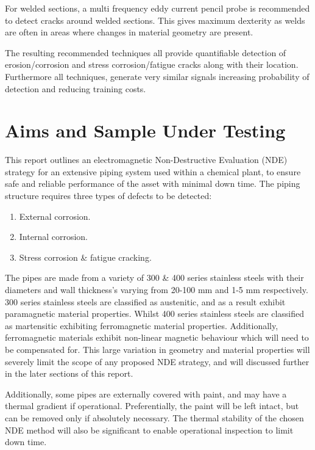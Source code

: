 \documentclass[a4paper,twoside,11pt]{article}
\begin{document}
For welded sections, a multi frequency eddy current pencil probe is recommended to detect cracks around welded sections. 
This gives maximum dexterity as welds are often in areas where changes in material geometry are present.

The resulting recommended techniques all provide quantifiable detection of erosion/corrosion and stress corrosion/fatigue cracks along with their location. Furthermore all techniques, generate very similar signals increasing probability of detection and reducing training costs.

\newpage


\section{Aims and Sample Under Testing}

This report outlines an electromagnetic Non-Destructive Evaluation (NDE) strategy for an extensive piping system used within a chemical plant, to ensure safe and reliable performance of the asset with minimal down time. The piping structure requires three types of defects to be detected:
\begin{enumerate}
	\item External corrosion.
	\item Internal corrosion.
	\item Stress corrosion \& fatigue cracking.
\end{enumerate}

The pipes are made from a variety of 300 \& 400 series stainless steels with their diameters and wall thickness's varying from 20-100 mm and 1-5 mm respectively. 
300 series stainless steels are classified as austenitic, and as a result exhibit paramagnetic material properties.
Whilst 400 series stainless steels are classified as martensitic exhibiting ferromagnetic material properties. 
Additionally, ferromagnetic materials exhibit non-linear magnetic behaviour which will need to be compensated for.
This large variation in geometry and material properties will severely limit the scope of any proposed NDE strategy, and will discussed further in the later sections of this report. 


Additionally, some pipes are externally covered with paint, and may have a thermal gradient if operational. 
Preferentially, the paint will be left intact, but can be removed only if absolutely necessary. The thermal stability of the chosen NDE method will also be significant to enable operational inspection to limit down time.
\end{document}
